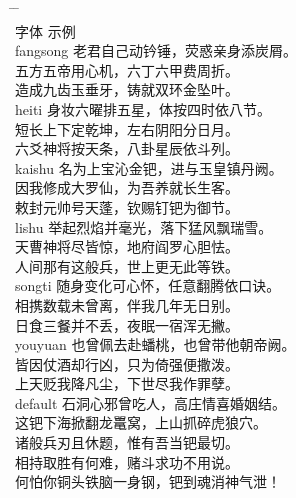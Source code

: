 \begin{tabbing}
\hspace{20mm} \= \hspace{20mm} \= \hspace{80mm} \kill\\
 \> 字体      \>  \hspace{26mm} 示例 \\
 \> fangsong \> \fangsong 老君自己动钤锤，荧惑亲身添炭屑。 \\
 \>          \> \fangsong 五方五帝用心机，六丁六甲费周折。 \\
 \>          \> \fangsong 造成九齿玉垂牙，铸就双环金坠叶。 \\
 \> heiti    \> \heiti 身妆六曜排五星，体按四时依八节。 \\
 \>          \> \heiti 短长上下定乾坤，左右阴阳分日月。 \\
 \>          \> \heiti 六爻神将按天条，八卦星辰依斗列。 \\
 \> kaishu    \> \kaishu 名为上宝沁金钯，进与玉皇镇丹阙。 \\
 \>          \> \kaishu 因我修成大罗仙，为吾养就长生客。 \\
 \>          \> \kaishu 敕封元帅号天蓬，钦赐钉钯为御节。 \\
 \> lishu    \> \lishu 举起烈焰并毫光，落下猛风飘瑞雪。 \\
 \>          \> \lishu 天曹神将尽皆惊，地府阎罗心胆怯。 \\
 \>          \> \lishu 人间那有这般兵，世上更无此等铁。 \\
 \> songti   \> \songti 随身变化可心怀，任意翻腾依口诀。 \\
 \>          \> \songti 相携数载未曾离，伴我几年无日别。 \\
 \>          \> \songti 日食三餐并不丢，夜眠一宿浑无撇。 \\
 \> youyuan    \> \youyuan 也曾佩去赴蟠桃，也曾带他朝帝阙。 \\
 \>          \> \youyuan 皆因仗酒却行凶，只为倚强便撒泼。 \\
 \>          \> \youyuan 上天贬我降凡尘，下世尽我作罪孽。 \\
 \> default  \> 石洞心邪曾吃人，高庄情喜婚姻结。 \\
 \>          \> 这钯下海掀翻龙鼍窝，上山抓碎虎狼穴。 \\
 \>          \> 诸般兵刃且休题，惟有吾当钯最切。 \\
 \>          \> 相持取胜有何难，赌斗求功不用说。 \\
 \>          \> 何怕你铜头铁脑一身钢，钯到魂消神气泄！
\end{tabbing}

